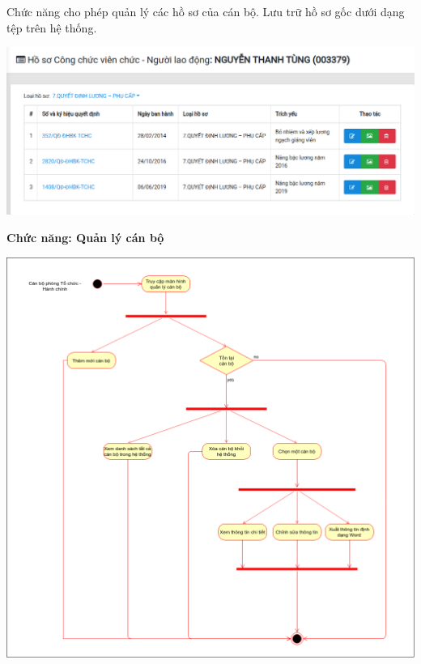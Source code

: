 Chức năng cho phép quản lý các hồ sơ của cán bộ. Lưu trữ hồ sơ gốc dưới dạng tệp trên hệ thống.
\begin{center}
  \captionsetup{type=figure}
  \includegraphics[width=15cm]{img/Screen/qlhoso.png}
\end{center}
\textbf{Chức năng: Quản lý cán bộ}\\
\begin{center}
  \captionsetup{type=figure}
  \includegraphics[width=15cm]{img/UML/TchcStaff/activityQuanLyCanBo.png}
\end{center}

